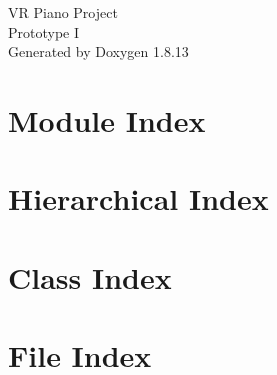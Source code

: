 \documentclass[twoside]{book}
\newcommand{\+}{\discretionary{\mbox{\scriptsize$\hookleftarrow$}}{}{}}
\newcommand{\clearemptydoublepage}{%
  \newpage{\pagestyle{empty}\cleardoublepage}%
}
\begin{document}
\hypersetup{pageanchor=false,
             bookmarksnumbered=true,
             pdfencoding=unicode
            }
\begin{titlepage}
\vspace*{7cm}
\begin{center}%
{\Large VR Piano Project \\[1ex]\large Prototype I }\\
\vspace*{1cm}
{\large Generated by Doxygen 1.8.13}\\
\end{center}
\end{titlepage}
\clearemptydoublepage
{}
\tableofcontents
\clearemptydoublepage
{}
\hypersetup{pageanchor=true}

\chapter{Module Index}

\chapter{Hierarchical Index}

\chapter{Class Index}

\chapter{File Index}

\end{document}
